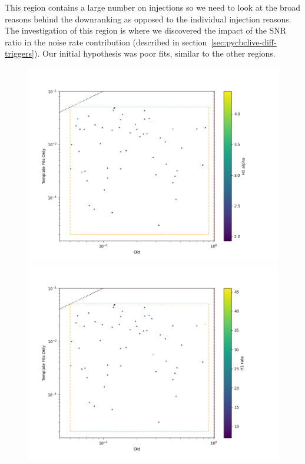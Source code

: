 This region contains a large number on injections so we need to look at the broad reasons behind the downranking as opposed to the individual injection reasons. The investigation of this region is where we discovered the impact of the SNR ratio in the noise rate contribution (described in section~\ref{sec:pycbclive-diff-triggers}). Our initial hypothesis was poor fits, similar to the other regions.
%
\begin{figure}
  \centering
  \begin{minipage}[t]{1.0\linewidth}
  
    \includegraphics[width=1\textwidth]{images/pycbclive/bl_h1_alpha.png}
    \caption{}
    \label{fig:pycbclive-bottom-left-h1-alpha}
    
    \includegraphics[width=1\textwidth]{images/pycbclive/bl_h1_rate.png}
    \caption{}
    \label{fig:pycbclive-bottom-left-h1-rate}
  
  \end{minipage}
\end{figure}
